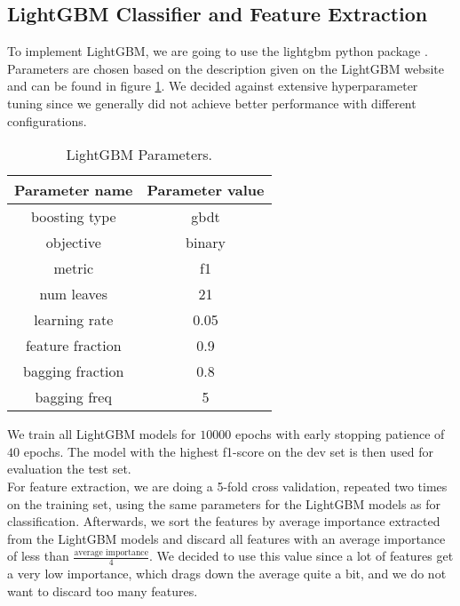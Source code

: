 \newpage

\subsection{LightGBM Classifier and Feature Extraction}
To implement LightGBM, we are going to use the lightgbm python package \cite{lgbmpython}. Parameters are chosen based on the description given on the LightGBM website \cite{lgbmpython} and can be found in figure \ref{fig:lgbmparams}. We decided against extensive hyperparameter tuning since we generally did not achieve better performance with different configurations.

\begin{table}[H]
  \begin{center}
   	\begin{tabular}{|| c | c ||}
   	\hline
   	Parameter name & Parameter value \\
   	\hline\hline
   	boosting type & gbdt \\
 	\hline
 	objective & binary \\
 	\hline
 	metric & f1 \\
 	\hline
 	num leaves & 21 \\
 	\hline
 	learning rate & 0.05 \\
 	\hline
 	feature fraction & 0.9 \\
 	\hline
 	bagging fraction & 0.8 \\
 	\hline
 	bagging freq & 5 \\
 	\hline
	\end{tabular}
  \end{center}
  \caption{LightGBM Parameters.}%
  \label{fig:lgbmparams}
\end{table}

We train all LightGBM models for $10000$ epochs with early stopping patience of $40$ epochs. The model with the highest f1-score on the dev set is then used for evaluation the test set. \\
For feature extraction, we are doing a 5-fold cross validation, repeated two times on the training set, using the same parameters for the LightGBM models as for classification. Afterwards, we sort the features by average importance extracted from the LightGBM models and discard all features with an average importance of less than $\frac{\text{average importance}}{4}$. We decided to use this value since a lot of features get a very low importance, which drags down the average quite a bit, and we do not want to discard too many features.


